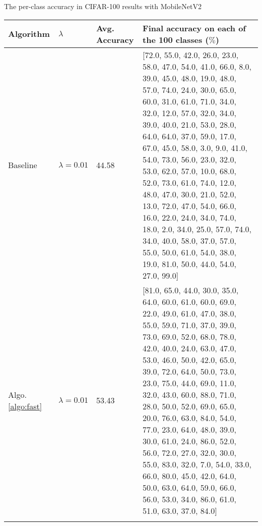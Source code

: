 \begin{table}[!hpb]
	\centering
	{The per-class accuracy in CIFAR-100 results with MobileNetV2}
	\label{tab:firstone}
	\begin{tabular}{@{}lllp{8cm}@{}} \toprule
		Algorithm & $\lambda$ &Avg. Accuracy&  Final accuracy on each of the 100 classes ($\%$)\\ \midrule
		Baseline&$\lambda=0.01$&  44.58& [72.0, 55.0, 42.0, 26.0, 23.0, 58.0, 47.0, 54.0, 41.0, 66.0, 8.0, 39.0, 45.0, 48.0, 19.0, 48.0, 57.0, 74.0, 24.0, 30.0, 65.0, 60.0, 31.0, 61.0, 71.0, 34.0, 32.0, 12.0, 57.0, 32.0, 34.0, 39.0, 40.0, 21.0, 53.0, 28.0, 64.0, 64.0, 37.0, 59.0, 17.0, 67.0, 45.0, 58.0, 3.0, 9.0, 41.0, 54.0, 73.0, 56.0, 23.0, 32.0, 53.0, 62.0, 57.0, 10.0, 68.0, 52.0, 73.0, 61.0, 74.0, 12.0, 48.0, 47.0, 30.0, 21.0, 52.0, 13.0, 72.0, 47.0, 54.0, 66.0, 16.0, 22.0, 24.0, 34.0, 74.0, 18.0, 2.0, 34.0, 25.0, 57.0, 74.0, 34.0, 40.0, 58.0, 37.0, 57.0, 55.0, 50.0, 61.0, 54.0, 38.0, 19.0, 81.0, 50.0, 44.0, 54.0, 27.0, 99.0]\\
		Algo. \ref{algo:fast}&$\lambda=0.01$&  53.43& [81.0, 65.0, 44.0, 30.0, 35.0, 64.0, 60.0, 61.0, 60.0, 69.0, 22.0, 49.0, 61.0, 47.0, 38.0, 55.0, 59.0, 71.0, 37.0, 39.0, 73.0, 69.0, 52.0, 68.0, 78.0, 42.0, 40.0, 24.0, 63.0, 47.0, 53.0, 46.0, 50.0, 42.0,
		65.0, 39.0, 72.0, 64.0, 50.0, 73.0, 23.0, 75.0, 44.0, 69.0, 11.0, 32.0, 43.0, 60.0, 88.0, 71.0, 28.0, 50.0, 52.0, 69.0, 65.0, 20.0, 76.0, 63.0, 84.0, 54.0, 77.0, 23.0, 64.0, 48.0, 39.0, 30.0, 61.0, 24.0,
		86.0, 52.0, 56.0, 72.0, 27.0, 32.0, 30.0, 55.0, 83.0, 32.0, 7.0, 54.0, 33.0, 66.0, 80.0, 45.0, 42.0, 64.0, 50.0, 63.0, 64.0, 59.0, 66.0, 56.0, 53.0, 34.0, 86.0, 61.0, 51.0, 63.0, 37.0, 84.0]
		\\ \bottomrule
		\label{tab:cifar100_mobile}
	\end{tabular}
\end{table}
